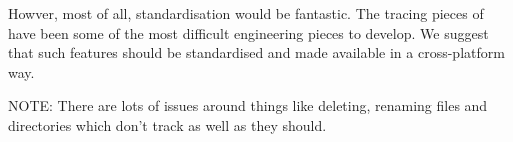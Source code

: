 Howver, most of all, standardisation would be fantastic. The tracing pieces of \Rattle have been some of the most difficult engineering pieces to develop. We suggest that such features should be standardised and made available in a cross-platform way.

NOTE: There are lots of issues around things like deleting, renaming files and directories which don't track as well as they should.
